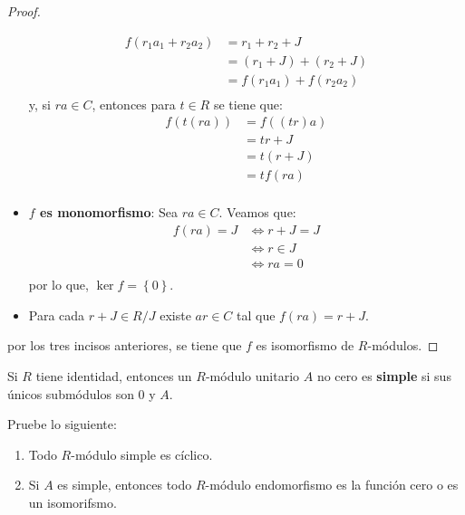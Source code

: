 \documentclass[12pt]{report}
\newcounter{it}
\theoremstyle{largebreak}
\begin{document}
\begin{proof}
\begin{itemize}
\begin{equation*}
                \begin{split}
                    f(r_1a_1+r_2a_2)&=r_1+r_2+J\\
                    &=(r_1+J)+(r_2+J)\\
                    &=f(r_1a_1)+f(r_2a_2)\\
                \end{split}
            \end{equation*}
            y, si $ra\in C$, entonces para $t\in R$ se tiene que:
            \begin{equation*}
                \begin{split}
                    f\left(t(ra) \right)&=f((tr)a)\\
                    &=tr+J\\
                    &=t(r+J)\\
                    &=tf(ra)\\
                \end{split}
            \end{equation*}
            \item \textbf{$f$ es monomorfismo}: Sea $ra\in C$. Veamos que:
            \begin{equation*}
                \begin{split}
                    f(ra)=J&\iff r+J=J\\
                    &\iff r\in J\\
                    &\iff ra=0\\
                \end{split}
            \end{equation*}
            por lo que, $\ker f=\left\{0 \right\}$.
            \item Para cada $r+J\in R/J$ existe $ar\in C$ tal que $f(ra)=r+J$.
        \end{itemize}
        por los tres incisos anteriores, se tiene que $f$ es isomorfismo de $R$-módulos.
    \end{proof}

    \begin{mydef}
        Si $R$ tiene identidad, entonces un $R$-módulo unitario $A$ no cero es \textbf{simple} si sus únicos submódulos son $0$ y $A$.
    \end{mydef}

    \begin{excer}
        Pruebe lo siguiente:
        \begin{enumerate}[label = \textit{(\arabic*)}]
            \item Todo $R$-módulo simple es cíclico.
            \item Si $A$ es simple, entonces todo $R$-módulo endomorfismo es la función cero o es un isomorifsmo.
        \end{enumerate}
    \end{excer}
\end{document}
